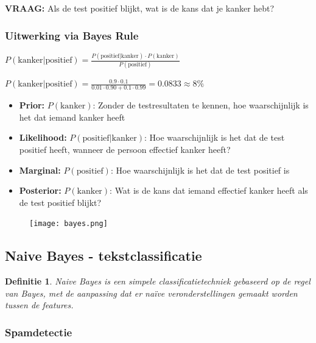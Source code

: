 \documentclass{article}
\newtheorem{theorem}{Definitie}[section]
\begin{document}
\textbf{VRAAG:} Als de test positief blijkt, wat is de kans dat je kanker hebt?


\subsubsection{Uitwerking via Bayes Rule}

\begin{center}
    $P(\text{kanker}|\text{positief}) = \frac{P(\text{positief}|\text{kanker}) \cdot P(\text{kanker})}{P(\text{positief})}$

    $P(\text{kanker}|\text{positief}) = \frac{0.9 \cdot 0.1}{0.01 \cdot 0.90 + 0.1 \cdot 0.99} = 0.0833 \approx 8\%$
\end{center}

\begin{itemize}
    \item \textbf{Prior:} $P(\text{kanker})$: Zonder de testresultaten te kennen, hoe waarschijnlijk is het dat iemand kanker heeft
    \item \textbf{Likelihood:} $P(\text{positief}|\text{kanker})$: Hoe waarschijnlijk is het dat de test positief heeft, wanneer de persoon effectief kanker heeft?
    \item \textbf{Marginal:} $P(\text{positief})$: Hoe waarschijnlijk is het dat de test positief is
    \item \textbf{Posterior:} $P(\text{kanker})$: Wat is de kans dat iemand effectief kanker heeft als de test positief blijkt?
\end{itemize}

\begin{figure}[H]
    \centering
    \texttt{[image: bayes.png]}
\end{figure}


\subsection{Naive Bayes - tekstclassificatie}

\begin{theorem}
    Naive Bayes is een simpele classificatietechniek gebaseerd op de regel van Bayes, 
    met de aanpassing dat er naïve veronderstellingen gemaakt worden tussen de features.
\end{theorem}

\subsubsection{Spamdetectie}
\end{document}
